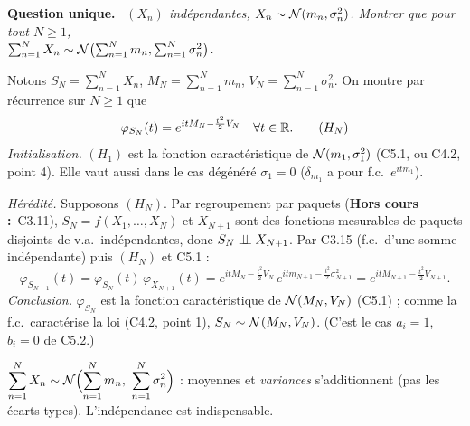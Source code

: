 \documentclass[11pt,a4paper]{article}
\newcommand{\question}[1]{\par\medskip\noindent\textbf{Question #1.}~}
\newcommand{\hc}{\textbf{Hors cours :}~}
\begin{document}
\begin{exo}

\question{unique} \emph{$(X_n)$ indépendantes, $X_n\sim\mathcal{N}(m_n,\sigma_n^2)$. Montrer que pour tout $N\ge1$,\\ $\sum_{n=1}^NX_n\sim\mathcal{N}\bigl(\sum_{n=1}^Nm_n,\sum_{n=1}^N\sigma_n^2\bigr)$.}

Notons $S_N=\sum_{n=1}^NX_n$, $M_N=\sum_{n=1}^Nm_n$, $V_N=\sum_{n=1}^N\sigma_n^2$. On montre par récurrence sur $N\ge1$ que
\[\varphi_{S_N}(t)=e^{itM_N-\frac{t^2}2V_N}\quad\forall t\in\mathbb{R} .\tag{$H_N$}\]
\emph{Initialisation.} $(H_1)$ est la fonction caractéristique de $\mathcal{N}(m_1,\sigma_1^2)$ (C5.1, ou C4.2, point 4). Elle vaut aussi
dans le cas dégénéré $\sigma_1=0$ ($\delta_{m_1}$ a pour f.c.\ $e^{itm_1}$).

\emph{Hérédité.} Supposons $(H_N)$. Par regroupement par paquets (\hc C3.11), $S_N=f(X_1,\dots,X_N)$ et $X_{N+1}$ sont des fonctions
mesurables de paquets disjoints de v.a.\ indépendantes, donc $S_N\perp\!\!\!\perp X_{N+1}$. Par C3.15 (f.c.\ d'une somme indépendante) puis $(H_N)$ et C5.1 :
\[\varphi_{S_{N+1}}(t)=\varphi_{S_N}(t)\,\varphi_{X_{N+1}}(t)=e^{itM_N-\frac{t^2}2V_N}\,e^{itm_{N+1}-\frac{t^2}2\sigma_{N+1}^2}
=e^{itM_{N+1}-\frac{t^2}2V_{N+1}} .\]
\emph{Conclusion.} $\varphi_{S_N}$ est la fonction caractéristique de $\mathcal{N}(M_N,V_N)$ (C5.1) ; comme la f.c.\ caractérise la loi
(C4.2, point 1), $S_N\sim\mathcal{N}(M_N,V_N)$. (C'est le cas $a_i=1$, $b_i=0$ de C5.2.)
\begin{resultat}
$\displaystyle\sum_{n=1}^NX_n\sim\Nc\Bigl(\sum_{n=1}^Nm_n,\ \sum_{n=1}^N\sigma_n^2\Bigr)$ : moyennes et \emph{variances} s'additionnent
(pas les écarts-types). L'indépendance est indispensable.
\end{resultat}
\end{exo}
\end{document}
